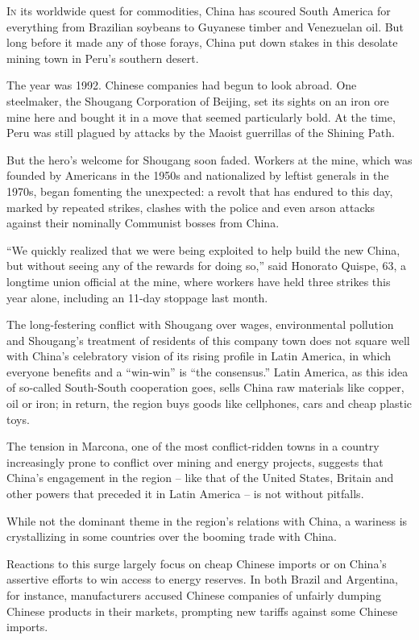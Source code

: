 ﻿\documentclass[12pt]{article}
\begin{document}
\lettrine{I}{n} its worldwide quest for commodities, China has scoured South
America for everything from Brazilian soybeans to Guyanese timber and Venezuelan oil. But long
before it made any of those forays, China put down stakes in this desolate mining town in Peru's
southern desert.

The year was 1992. Chinese companies had begun to look abroad. One steelmaker, the Shougang
Corporation of Beijing, set its sights on an iron ore mine here and bought it in a move that seemed
particularly bold. At the time, Peru was still plagued by attacks by the Maoist guerrillas of the
Shining Path.

But the hero's welcome for Shougang soon faded. Workers at the mine, which was founded by Americans
in the 1950s and nationalized by leftist generals in the 1970s, began fomenting the unexpected: a
revolt that has endured to this day, marked by repeated strikes, clashes with the police and even
arson attacks against their nominally Communist bosses from China.

``We quickly realized that we were being exploited to help build the new China, but without seeing
any of the rewards for doing so,'' said Honorato Quispe, 63, a longtime union official at the mine,
where workers have held three strikes this year alone, including an 11-day stoppage last month.

The long-festering conflict with Shougang over wages, environmental pollution and Shougang's
treatment of residents of this company town does not square well with China's celebratory vision of
its rising profile in Latin America, in which everyone benefits and a ``win-win'' is ``the
consensus.'' Latin America, as this idea of so-called South-South cooperation goes, sells China raw
materials like copper, oil or iron; in return, the region buys goods like cellphones, cars and cheap
plastic toys.

The tension in Marcona, one of the most conflict-ridden towns in a country increasingly prone to
conflict over mining and energy projects, suggests that China's engagement in the region -- like
that of the United States, Britain and other powers that preceded it in Latin America -- is not
without pitfalls.

While not the dominant theme in the region's relations with China, a wariness is crystallizing in
some countries over the booming trade with China.

Reactions to this surge largely focus on cheap Chinese imports or on China's assertive efforts to
win access to energy reserves. In both Brazil and Argentina, for instance, manufacturers accused
Chinese companies of unfairly dumping Chinese products in their markets, prompting new tariffs
against some Chinese imports.
\end{document}

